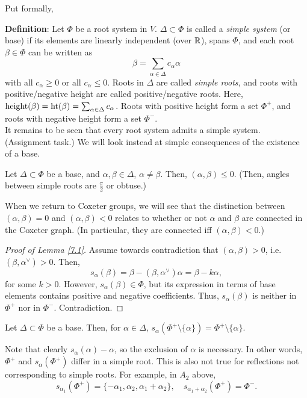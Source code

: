 Put formally,

{\bf Definition}:
Let $\Phi$ be a root system in $V$. $\Delta \subset \Phi$ is called a {\em
simple system} (or base) if its elements are linearly independent (over $\mathbb{R}$),
spans $\Phi$, and each root $\beta \in \Phi$ can be written as
\[
    \beta = \sum_{\alpha \in \Delta} c_\alpha \alpha
\]
with all $c_\alpha \geq 0$ or all $c_\alpha \leq 0$. Roots in $\Delta$ are
called {\em simple roots}, and roots with positive/negative height are called
positive/negative roots. Here,
${\rm height}(\beta)= {\rm ht}(\beta) = \sum_{\alpha \in \Delta} c_\alpha$.
Roots with positive height form a set $\Phi^+$, and roots with negative height
form a set $\Phi^-$.
\\

It remains to be seen that every root system admits a simple system. (Assignment
task.) We will look instead at simple consequences of the existence of a base.

\begin{lemma} \label{7.1}
Let $\Delta \subset \Phi$ be a base, and $\alpha, \beta \in \Delta$, $\alpha
\neq \beta$. Then, $(\alpha, \beta) \leq 0$. (Then, angles between simple roots
are $\frac{\pi}{2}$ or obtuse.)
\end{lemma}

When we return to Coxeter groups, we will see that the distinction between
$(\alpha, \beta) = 0$ and $(\alpha, \beta) < 0$ relates to whether or not
$\alpha$ and $\beta$ are connected in the Coxeter graph. (In particular, they
are connected iff $(\alpha, \beta) < 0$.)

\begin{proof}[Proof of Lemma \ref{7.1}]
Assume towards contradiction that $(\alpha, \beta) > 0$, i.e.
$(\beta, \alpha^\vee) > 0$. Then,
\[
    s_\alpha(\beta) = \beta - (\beta, \alpha^\vee) \alpha = \beta - k\alpha,
\]
for some $k > 0$. However, $s_\alpha(\beta) \in \Phi$, but its expression in
terms of base elements contains positive and negative coefficients. Thus,
$s_\alpha(\beta)$ is neither in $\Phi^+$ nor in $\Phi^-$. Contradiction.
\end{proof}

\begin{lemma} \label{7.2} %
Let $\Delta \subset \Phi$ be a base. Then, for $\alpha \in \Delta$,
$s_\alpha(\Phi^+ \setminus \{\alpha\}) = \Phi^+ \setminus \{\alpha\}$.
\end{lemma}

Note that clearly $s_\alpha(\alpha) - \alpha$, so the exclusion of $\alpha$ is
necessary. In other words, $\Phi^+$ and $s_\alpha(\Phi^+)$ differ in a simple
root. This is also not true for reflections not corresponding to simple roots.
For example, in $A_2$ above,
\[
    s_{\alpha_1}(\Phi^+) = \{-\alpha_1, \alpha_2, \alpha_1 + \alpha_2\},
    \quad
    s_{\alpha_1 + \alpha_2}(\Phi^+) = \Phi^-.
\]

